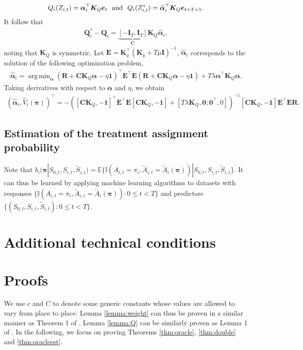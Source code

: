 \documentclass{article}
\DeclareMathOperator*{\argmin}{arg\,min}
\newcommand{\Mean}{{\mathbb{E}}}
\begin{document}
\begin{eqnarray*}
	Q_i(Z_{i,t})=\bm{\alpha}_i^\top \bm{K}_Q \bm{e}_t\,\,\,\,\hbox{and}\,\,\,\,Q_i(Z_{i,t}^*)=\widehat{\bm{\alpha}}_i^\top \bm{K}_Q \bm{e}_{t+T+1}.
\end{eqnarray*}
It follow that
\begin{eqnarray*}
	\bm{Q}_i^*-\bm{Q}_i=\underbrace{[-\bm{I}_{T}, \bm{I}_{T}]}_{\bm{C}}\bm{K}_Q \widehat{\bm{\alpha}}_i,
\end{eqnarray*}
noting that $\bm{K}_Q$ is symmetric. Let $\bm{E}=\bm{K}_g^\top (\bm{K}_g+T\mu \bm{I})^{-1}$, $\widehat{\bm{\alpha}}_i$ corresponds to the solution of the following optimization problem, 
\begin{eqnarray*}
	\widehat{\bm{\alpha}}_i=\argmin_{\bm{\alpha}} (\bm{R}+\bm{C} \bm{K}_Q \bm{\alpha}-\eta \bm{1})^\top \bm{E}^\top \bm{E} (\bm{R}+\bm{C} \bm{K}_Q \bm{\alpha}-\eta \bm{1})+T \lambda \bm{\alpha}^\top \bm{K}_Q \bm{\alpha}.
\end{eqnarray*}
Taking derivatives with respect to $\bm{\alpha}$ and $\eta$, we obtain
\begin{eqnarray*}
	(\widehat{\bm{\alpha}}_i,\widehat{V}_i(\bm{\pi}))^\top=-([\bm{C} \bm{K}_Q,-\bm{1}]^\top \bm{E}^\top \bm{E}[\bm{C} \bm{K}_Q,-\bm{1}]+[T\lambda \bm{K}_Q,\bm{0};\bm{0}^\top,0])^{-1}[\bm{C} \bm{K}_Q,-\bm{1}] \bm{E}^\top \bm{E} \bm{R}.
\end{eqnarray*}

\subsection{Estimation of the treatment assignment probability}\label{sec:propensity}
Note that $b_i(\bm{\pi}|S_{0,t},S_{i,t},\widetilde{S}_{i,t})=\Mean \{\mathbb{I}(A_{i,t}=\pi_i,\widetilde{A}_{i,t}=\widetilde{A}_i(\bm{\pi}))|S_{0,t},S_{i,t},\widetilde{S}_{i,t}\}$. It can thus be learned by applying machine learning algorithms to datasets with responses $\{ \mathbb{I}(A_{i,t}=\pi_i,\widetilde{A}_{i,t}=\widetilde{A}_i(\bm{\pi})):0\le t< T \}$ and predictors $\{(S_{0,t},S_{i,t},\widetilde{S}_{i,t}):0\le t<T\}$. 

\section{Additional technical conditions}\label{sec:addtechcond}

\section{Proofs}
We use $c$ and $C$ to denote some generic constants whose values are allowed to vary from place to place. 
Lemma \ref{lemma:weight} can thus be proven in a similar manner as Theorem 1 of \cite{liu2018}.  Lemma \ref{lemma:Q} can be similarly proven as Lemma 1 of \cite{shi2020reinforcement}. In the following, we focus on proving Theorems \ref{thm:oracle}, \ref{thm:double} and \ref{thm:oracleest}. 
\end{document}
